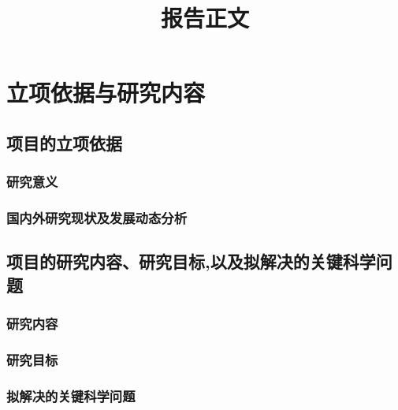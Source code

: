 \documentclass[a4paper,11pt]{article}
\title{\textbf{报告正文}}
\author{}
\date{}
\begin{document}
\maketitle

\section{立项依据与研究内容}
\subsection{项目的立项依据}

\subsubsection{研究意义}
\label{sec:background}

\subsubsection{国内外研究现状及发展动态分析}
\label{sec:review}

\renewcommand\refname{\subsubsection{主要参考文献}}
\begin{spacing}{0.9}


\end{spacing}


\subsection{项目的研究内容、研究目标,以及拟解决的关键科学问题}
\subsubsection{研究内容}


\subsubsection{研究目标}




\subsubsection{拟解决的关键科学问题}
\end{document}
